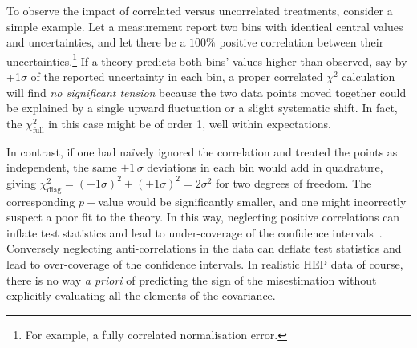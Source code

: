     To observe the impact of correlated versus uncorrelated treatments, consider a simple example.
    Let a measurement report two bins with identical central values and uncertainties, and let there be a $100\%$ positive correlation between their uncertainties.\footnote{For example, a fully correlated normalisation error.}
    If a theory predicts both bins' values higher than observed, say by +1$\sigma$ of the reported uncertainty in each bin, a proper correlated $\chi^2$ calculation will find \emph{no significant tension} because the two data points moved together could be explained by a single upward fluctuation or a slight systematic shift.
    In fact, the $\chi^2_{\text{full}}$ in this case might be of order 1, well within expectations.
    
    In contrast, if one had na\"ively ignored the correlation and treated the points as independent, the same $+1\,\sigma$ deviations in each bin would add in quadrature, giving $\chi^2_{\text{diag}} = (+1\sigma)^2 + (+1\sigma)^2 = 2\sigma^2$ for two degrees of freedom.
    The corresponding $p-$value would be significantly smaller, and one might incorrectly suspect a poor fit to the theory.
    In this way, neglecting positive correlations can inflate test statistics and lead to under-coverage of the confidence intervals~\cite{Alexe:2024smm}.
    Conversely neglecting anti-correlations in the data can deflate test statistics and lead to over-coverage of the confidence intervals.
    In realistic HEP data of course, there is no way \textit{a priori} of predicting the sign of the misestimation without explicitly evaluating all the elements of the covariance.
    
